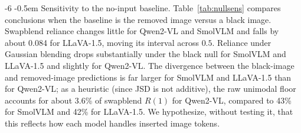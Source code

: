 \documentclass[graybox]{svmult}
\makeatletter
\newcommand{\checknum}[2]{#1}
\renewcommand\paragraph{\@startsection{paragraph}{4}{\z@}%
  {-6\p@ \@plus -2\p@ \@minus -2\p@}%
  {-0.5em}%
  {\normalfont\normalsize\bfseries}}
\makeatother
\begin{document}
\paragraph{Sensitivity to the no-input baseline.}
\label{sec:nullsens}
Table~\ref{tab:nullsens} compares conclusions when the baseline is the
removed image versus a black image. Swapblend reliance changes little for
Qwen2-VL and SmolVLM and falls by about
\checknum{0.084}{nullsens:llava:swapblend:R_hat_drop} for LLaVA-1.5, moving
its interval across $0.5$. Reliance under Gaussian blending drops
substantially under the black null for SmolVLM and LLaVA-1.5 and slightly
for Qwen2-VL. The divergence between the black-image and removed-image
predictions is far larger for SmolVLM and LLaVA-1.5 than for Qwen2-VL; as a
heuristic (since JSD is not additive), the raw unimodal floor accounts for
about \checknum{3.6}{floor:Qwen2-VL-2B-Instruct:fraction_pct}\% of
swapblend $R(1)$ for Qwen2-VL, compared to
\checknum{43}{floor:SmolVLM-Instruct:fraction_pct}\% for SmolVLM and
\checknum{42}{floor:llava-1.5-7b-hf:fraction_pct}\% for LLaVA-1.5. We
hypothesize, without testing it, that this reflects how each model handles
inserted image tokens.
\end{document}
